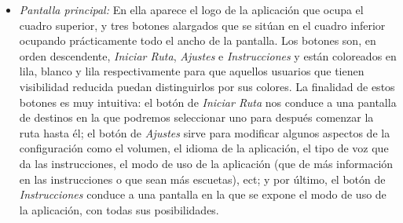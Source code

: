 \begin{itemize}
	\item \textit{Pantalla principal:} En ella aparece el logo de la aplicación que ocupa el cuadro superior, y tres botones alargados que se sitúan en el cuadro inferior ocupando prácticamente todo el ancho de la pantalla. Los botones son, en orden descendente, \textit{Iniciar Ruta}, \textit{Ajustes} e \textit{Instrucciones} y están coloreados en lila, blanco y lila respectivamente para que aquellos usuarios que tienen visibilidad reducida puedan distinguirlos por sus colores. La finalidad de estos botones es muy intuitiva: el botón de \textit{Iniciar Ruta} nos conduce a una pantalla de destinos en la que podremos seleccionar uno para después comenzar la ruta hasta él; el botón de \textit{Ajustes} sirve para modificar algunos aspectos de la configuración como el volumen, el idioma de la aplicación, el tipo de voz que da las instrucciones, el modo de uso de la aplicación (que de más información en las instrucciones o que sean más escuetas), ect; y por último, el botón de \textit{Instrucciones} conduce a una pantalla en la que se expone el modo de uso de la aplicación, con todas sus posibilidades.
	

\end{itemize}
